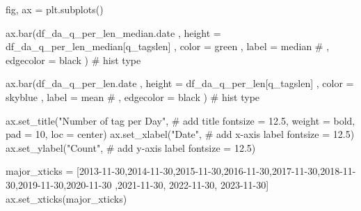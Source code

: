 \documentclass[
  letterpaper,
  DIV=11,
  numbers=noendperiod]{scrartcl}
\newenvironment{Shaded}{\begin{snugshade}}{\end{snugshade}}
\newcommand{\CommentTok}[1]{\textcolor[rgb]{0.37,0.37,0.37}{#1}}
\newcommand{\DecValTok}[1]{\textcolor[rgb]{0.68,0.00,0.00}{#1}}
\newcommand{\FloatTok}[1]{\textcolor[rgb]{0.68,0.00,0.00}{#1}}
\newcommand{\NormalTok}[1]{\textcolor[rgb]{0.00,0.23,0.31}{#1}}
\newcommand{\OperatorTok}[1]{\textcolor[rgb]{0.37,0.37,0.37}{#1}}
\newcommand{\StringTok}[1]{\textcolor[rgb]{0.13,0.47,0.30}{#1}}
\begin{document}
\begin{Shaded}
\begin{Highlighting}[]
\NormalTok{fig, ax }\OperatorTok{=}\NormalTok{ plt.subplots()}

\NormalTok{ax.bar(df\_da\_q\_per\_len\_median.date}
\NormalTok{    ,  height }\OperatorTok{=}\NormalTok{ df\_da\_q\_per\_len\_median[}\StringTok{\textquotesingle{}q\_tagslen\textquotesingle{}}\NormalTok{]}
\NormalTok{    ,  color }\OperatorTok{=} \StringTok{\textquotesingle{}green\textquotesingle{}}
\NormalTok{    ,  label }\OperatorTok{=} \StringTok{\textquotesingle{}median\textquotesingle{}}
    \CommentTok{\# ,  edgecolor = \textquotesingle{}black\textquotesingle{}}
\NormalTok{      ) }\CommentTok{\# hist type}


\NormalTok{ax.bar(df\_da\_q\_per\_len.date}
\NormalTok{    ,  height }\OperatorTok{=}\NormalTok{ df\_da\_q\_per\_len[}\StringTok{\textquotesingle{}q\_tagslen\textquotesingle{}}\NormalTok{]}
\NormalTok{    ,  color }\OperatorTok{=} \StringTok{\textquotesingle{}skyblue\textquotesingle{}}
\NormalTok{    ,  label }\OperatorTok{=} \StringTok{\textquotesingle{}mean\textquotesingle{}}
    \CommentTok{\# ,  edgecolor = \textquotesingle{}black\textquotesingle{}}
\NormalTok{      ) }\CommentTok{\# hist type}



\NormalTok{ax.set\_title(}\StringTok{"Number of tag per Day"}\NormalTok{, }\CommentTok{\# add title}
\NormalTok{             fontsize }\OperatorTok{=} \FloatTok{12.5}\NormalTok{,}
\NormalTok{             weight }\OperatorTok{=} \StringTok{\textquotesingle{}bold\textquotesingle{}}\NormalTok{,}
\NormalTok{             pad }\OperatorTok{=} \DecValTok{10}\NormalTok{,}
\NormalTok{             loc }\OperatorTok{=} \StringTok{\textquotesingle{}center\textquotesingle{}}\NormalTok{)}
\NormalTok{ax.set\_xlabel(}\StringTok{"Date"}\NormalTok{, }\CommentTok{\# add x{-}axis label}
\NormalTok{              fontsize }\OperatorTok{=} \FloatTok{12.5}\NormalTok{)}
\NormalTok{ax.set\_ylabel(}\StringTok{"Count"}\NormalTok{, }\CommentTok{\# add y{-}axis label}
\NormalTok{              fontsize }\OperatorTok{=} \FloatTok{12.5}\NormalTok{)}

\NormalTok{major\_xticks }\OperatorTok{=}\NormalTok{ [}\StringTok{\textquotesingle{}2013{-}11{-}30\textquotesingle{}}\NormalTok{,}\StringTok{\textquotesingle{}2014{-}11{-}30\textquotesingle{}}\NormalTok{,}\StringTok{\textquotesingle{}2015{-}11{-}30\textquotesingle{}}\NormalTok{,}\StringTok{\textquotesingle{}2016{-}11{-}30\textquotesingle{}}\NormalTok{,}\StringTok{\textquotesingle{}2017{-}11{-}30\textquotesingle{}}\NormalTok{,}\StringTok{\textquotesingle{}2018{-}11{-}30\textquotesingle{}}\NormalTok{,}\StringTok{\textquotesingle{}2019{-}11{-}30\textquotesingle{}}\NormalTok{,}\StringTok{\textquotesingle{}2020{-}11{-}30\textquotesingle{}}
\NormalTok{                ,}\StringTok{\textquotesingle{}2021{-}11{-}30\textquotesingle{}}\NormalTok{, }\StringTok{\textquotesingle{}2022{-}11{-}30\textquotesingle{}}\NormalTok{, }\StringTok{\textquotesingle{}2023{-}11{-}30\textquotesingle{}}\NormalTok{]}
\NormalTok{ax.set\_xticks(major\_xticks)}


\end{Highlighting}
\end{Shaded}
\end{document}
